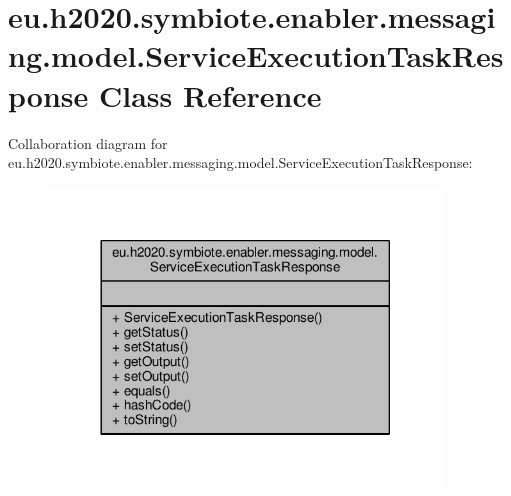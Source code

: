 \hypertarget{classeu_1_1h2020_1_1symbiote_1_1enabler_1_1messaging_1_1model_1_1ServiceExecutionTaskResponse}{}\section{eu.\+h2020.\+symbiote.\+enabler.\+messaging.\+model.\+Service\+Execution\+Task\+Response Class Reference}
\label{classeu_1_1h2020_1_1symbiote_1_1enabler_1_1messaging_1_1model_1_1ServiceExecutionTaskResponse}


Collaboration diagram for eu.\+h2020.\+symbiote.\+enabler.\+messaging.\+model.\+Service\+Execution\+Task\+Response\+:
\nopagebreak
\begin{figure}[H]
\begin{center}
\leavevmode
\includegraphics[width=296pt]{classeu_1_1h2020_1_1symbiote_1_1enabler_1_1messaging_1_1model_1_1ServiceExecutionTaskResponse__coll__graph}
\end{center}
\end{figure}
